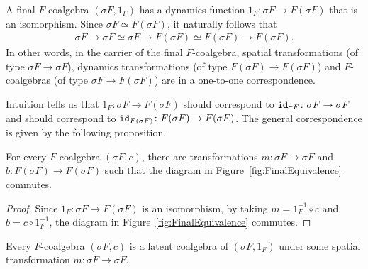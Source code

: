 A final $F$-coalgebra $(\sigma F, 1_F)$ has a dynamics function $1_F\colon \sigma F \rightarrow F(\sigma F)$ that is an isomorphism. Since $\sigma F \simeq F(\sigma F)$, it naturally follows that 
\begin{align}
    \sigma F\rightarrow \sigma F \simeq \sigma F\rightarrow F(\sigma F) \simeq F(\sigma F)\rightarrow F(\sigma F).    
\end{align}
In other words, in the carrier of the final $F$-coalgebra, spatial transformations (of type $\sigma F\rightarrow \sigma F$), dynamics transformations (of type $F(\sigma F)\rightarrow F(\sigma F)$) and $F$-coalgebras (of type $\sigma F\rightarrow F(\sigma F)$) are in a one-to-one correspondence. 

Intuition tells us that $1_F\colon \sigma F \rightarrow F(\sigma F)$ should correspond to ${\texttt{id}}_{\sigma F}\colon \sigma F\rightarrow \sigma F$ and should correspond to ${\texttt{id}}_{F(\sigma F)}\colon F(\sigma F)\rightarrow F(\sigma F)$. The general correspondence is given by the following proposition.
\begin{proposition}
    For every $F$-coalgebra $(\sigma F, c)$, there are transformations $m\colon \sigma F\rightarrow \sigma F$ and $b\colon F(\sigma F)\rightarrow F(\sigma F)$ such that the diagram in Figure~\ref{fig:FinalEquivalence} commutes.
\end{proposition}
\begin{proof}
    Since $1_F\colon \sigma F\rightarrow F(\sigma F)$ is an isomorphism, by taking $m=1_F^{-1}\circ c$ and $b=c\circ 1_F^{-1}$, the diagram in Figure~\ref{fig:FinalEquivalence} commutes.
\end{proof}
\begin{corollary}
    Every $F$-coalgebra $(\sigma F, c)$ is a latent coalgebra of $(\sigma F, 1_F)$ under some spatial transformation $m\colon \sigma F\rightarrow \sigma F$.
\end{corollary}

